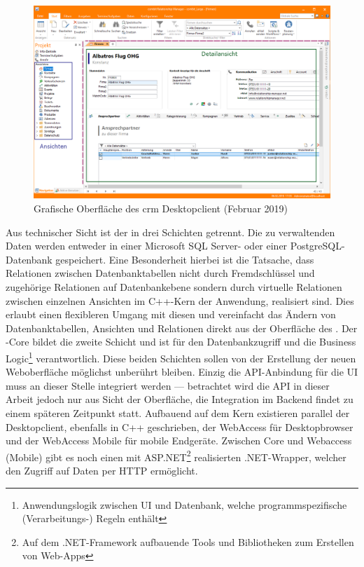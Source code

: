 \begin{figure}
    \centering
    \captionsetup{justification=centering}
    \includegraphics[width=\textwidth]{figures/crm_ui.png}
        \caption{Grafische Oberfläche des \gls{crm} Desktopclient (Februar 2019)}\label{fig:crm_ui}
\end{figure}

Aus technischer Sicht ist der  in drei Schichten getrennt. Die zu verwaltenden Daten werden entweder in einer Microsoft SQL Server- oder einer PostgreSQL-Datenbank gespeichert. Eine Besonderheit hierbei ist die Tatsache, dass Relationen zwischen Datenbanktabellen nicht durch Fremdschlüssel und zugehörige Relationen auf Datenbankebene sondern durch virtuelle Relationen zwischen einzelnen Ansichten im C++-Kern der Anwendung, realisiert sind. Dies erlaubt einen flexibleren Umgang mit diesen und vereinfacht das Ändern von Datenbanktabellen, Ansichten und Relationen direkt aus der Oberfläche des .
Der -Core bildet die zweite Schicht und ist für den Datenbankzugriff und die Business Logic\footnote{Anwendungslogik zwischen UI und Datenbank, welche programmspezifische (Verarbeitungs-) Regeln enthält} verantwortlich. Diese beiden Schichten sollen von der Erstellung der neuen Weboberfläche möglichst unberührt bleiben. Einzig die API-Anbindung für die UI muss an dieser Stelle integriert werden --- betrachtet wird die API in dieser Arbeit jedoch nur aus Sicht der Oberfläche, die Integration im Backend findet zu einem späteren Zeitpunkt statt.
Aufbauend auf dem Kern existieren parallel der Desktopclient, ebenfalls in C++ geschrieben, der WebAccess für Desktopbrowser und der WebAccess Mobile für mobile Endgeräte. Zwischen Core und Webaccess (Mobile) gibt es noch einen mit ASP.NET\footnote{Auf dem .NET-Framework aufbauende Tools und Bibliotheken zum Erstellen von Web-Apps} realisierten .NET-Wrapper, welcher den Zugriff auf Daten per HTTP ermöglicht.

